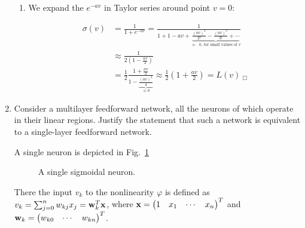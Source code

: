 \begin{enumerate}
\begin{solution}
\begin{enumerate}
    \item We expand the $e^{-av}$ in Taylor series around point $v=0$:
      
      \begin{equation}
        \begin{split}
          \sigma(v) &= \frac{1}{1 + e^{-av}} = \frac{1}{1 + 1 - av +
            \underbrace{\frac{(av)^2}{2!} - \frac{(av)^3}{3!} +
              \cdots}_{\mbox{$\approx$ $0$, for small values of $v$}}} \\ 
          &\approx \frac{1}{2 ( 1 - \frac{av}{2})} \\
          &= \frac{1}{2} \frac{1 + \frac{av}{2}} {1 -
            \underbrace{\frac{(av)^2}{4}}_{\approx 0}} \approx \frac{1}{2}
          \left(1 + \frac{av}{2} \right) = L(v) \: _\Box
        \end{split}
      \end{equation}
      
    \end{enumerate}

  \end{solution}
  

\item

  Consider a multilayer feedforward network, all the neurons of which
  operate in their linear regions. Justify the statement that such a
  network is equivalent to a single-layer feedforward network.

  \begin{solution}
    A single neuron is depicted in Fig.~\ref{fig:singleneuron}


    \begin{figure}[hb]
      \begin{center}
        
        \caption{\label{fig:singleneuron} A single sigmoidal neuron.}
      \end{center}
    \end{figure}
    
    There the input $v_k$ to the nonlinearity $\varphi$ is defined as
    $v_k = \sum_{j = 0}^n w_{kj}x_j = {\bf{w}}_k^T {\bf{x}}$, \newline
    where ${\bf{x}}=\begin{pmatrix} 1 & x_1 &\cdots & x_n
    \end{pmatrix}^T$ and ${\bf{w}}_k=\begin{pmatrix} w_{k0} &\cdots &
      w_{kn} \end{pmatrix}^T$.


\end{solution}
\end{enumerate}
